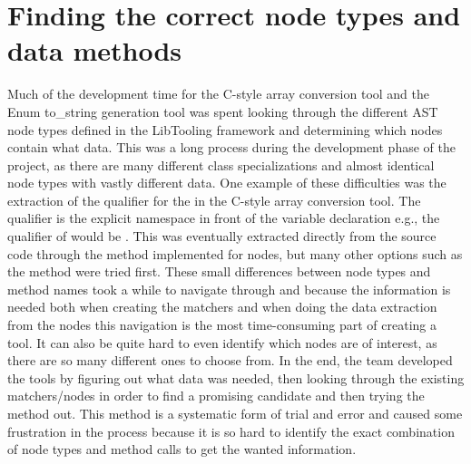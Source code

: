 
\section{Finding the correct node types and data methods}

Much of the development time for the C-style array conversion tool and the Enum to\_string generation tool was spent looking through the different AST node types defined in the LibTooling framework and determining which nodes contain what data. This was a long process during the development phase of the project, as there are many different class specializations and almost identical node types with vastly different data. One example of these difficulties was the extraction of the qualifier for the  in the C-style array conversion tool. The qualifier is the explicit namespace in front of the variable declaration e.g., the qualifier of  would be . This was eventually extracted directly from the source code through the   method implemented for  nodes, but many other options such as the  method were tried first. These small differences between node types and method names took a while to navigate through and because the information is needed both when creating the matchers and when doing the data extraction from the nodes this navigation is the most time-consuming part of creating a tool. It can also be quite hard to even identify which nodes are of interest, as there are so many different ones to choose from. In the end, the team developed the tools by figuring out what data was needed, then looking through the existing matchers/nodes in order to find a promising candidate and then trying the method out. This method is a systematic form of trial and error and caused some frustration in the process because it is so hard to identify the exact combination of node types and method calls to get the wanted information.